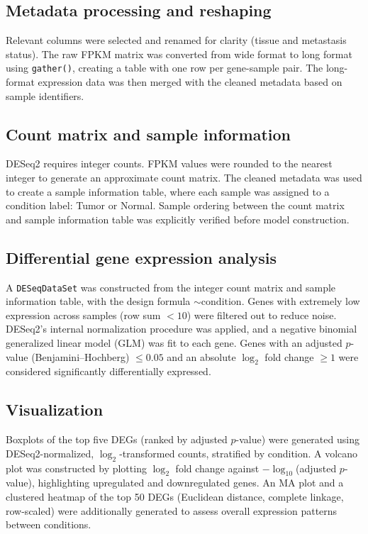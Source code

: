 \documentclass[12pt]{article}
\begin{document}
\subsection{Metadata processing and reshaping}
Relevant columns were selected and renamed for clarity (tissue and metastasis
status). The raw FPKM matrix was converted from wide format to long format
using \texttt{gather()}, creating a table with one row per gene-sample pair.
The long-format expression data was then merged with the cleaned metadata
based on sample identifiers.

\subsection{Count matrix and sample information}
DESeq2 requires integer counts. FPKM values were rounded to the nearest
integer to generate an approximate count matrix. The cleaned metadata was used
to create a sample information table, where each sample was assigned to a
condition label: Tumor or Normal. Sample ordering between the count matrix and
sample information table was explicitly verified before model construction.

\subsection{Differential gene expression analysis}
A \texttt{DESeqDataSet} was constructed from the integer count matrix and
sample information table, with the design formula $\sim \text{condition}$.
Genes with extremely low expression across samples (row sum $< 10$) were
filtered out to reduce noise. DESeq2's internal normalization procedure was
applied, and a negative binomial generalized linear model (GLM) was fit to
each gene. Genes with an adjusted $p$-value (Benjamini--Hochberg) $\leq 0.05$
and an absolute $\log_2$ fold change $\geq 1$ were considered significantly
differentially expressed.

\subsection{Visualization}
Boxplots of the top five DEGs (ranked by adjusted $p$-value) were generated
using DESeq2-normalized, $\log_2$-transformed counts, stratified by condition.
A volcano plot was constructed by plotting $\log_2$ fold change against
$-\log_{10}$(adjusted $p$-value), highlighting upregulated and downregulated
genes. An MA plot and a clustered heatmap of the top 50 DEGs (Euclidean
distance, complete linkage, row-scaled) were additionally generated to assess
overall expression patterns between conditions.
\end{document}
